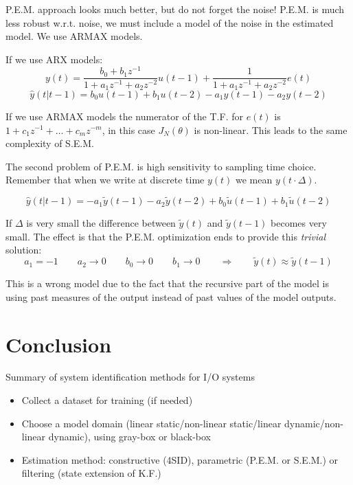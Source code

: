 P.E.M. approach looks much better, but do not forget the noise! P.E.M. is much less robust w.r.t. noise, we must include a model of the noise in the estimated model.
We use ARMAX models.

If we use ARX models:
\[
    y(t) = \frac{b_0+b_1z^{-1}}{1+a_1z^{-1}+a_2z^{-2}}u(t-1) + \frac{1}{1+a_1z^{-1}+a_2z^{-2}}e(t)
\]
\[
    \hat{y}(t|t-1) = b_0u(t-1)+b_1u(t-2) - a_1y(t-1)-a_2y(t-2)
\]

If we use ARMAX models the numerator of the T.F. for $e(t)$ is $1+c_1z^{-1}+\ldots+c_mz^{-m}$, in this case $J_N(\theta)$ is non-linear.
This leads to the same complexity of S.E.M.

The second problem of P.E.M. is high sensitivity to sampling time choice.
Remember that when we write at discrete time $y(t)$ we mean $y(t\cdot \Delta)$.

\[
    \hat{y}(t|t-1) = -a_1\tilde{y}(t-1)-a_2\tilde{y}(t-2) + b_0\tilde{u}(t-1)+b_1\tilde{u}(t-2)
\]

If $\Delta$ is very small the difference between $\tilde{y}(t)$ and $\tilde{y}(t-1)$ becomes very small.
The effect is that the P.E.M. optimization ends to provide this \emph{trivial} solution:
\[
    a_1 = -1 \qquad a_2 \rightarrow 0 \qquad b_0 \rightarrow 0 \qquad b_1 \rightarrow 0 \qquad \Rightarrow \qquad \tilde{y}(t) \approx \tilde{y}(t-1)
\]

This is a wrong model due to the fact that the recursive part of the model is using past measures of the output instead of past values of the model outputs.

\section{Conclusion}

Summary of system identification methods for I/O systems
\begin{figure}[H]
    \centering
\end{figure}

\begin{itemize}
    \item Collect a dataset for training (if needed)
    \item Choose a model domain (linear static/non-linear static/linear dynamic/non-linear dynamic), using gray-box or black-box
    \item Estimation method: constructive (4SID), parametric (P.E.M. or S.E.M.) or filtering (state extension of K.F.)
\end{itemize}

